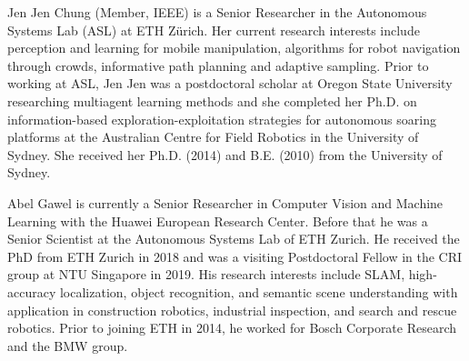 \documentclass[journal]{IEEEtran}  %
\begin{document}
\begin{IEEEbiography}{Jen Jen Chung}
(Member, IEEE) is a Senior Researcher in the Autonomous Systems Lab (ASL) at ETH Zürich. Her current research interests include perception and learning for mobile manipulation, algorithms for robot navigation through crowds, informative path planning and adaptive sampling. Prior to working at ASL, Jen Jen was a postdoctoral scholar at Oregon State University researching multiagent learning methods and she completed her Ph.D. on information-based exploration-exploitation strategies for autonomous soaring platforms at the Australian Centre for Field Robotics in the University of Sydney. She received her Ph.D. (2014) and B.E. (2010) from the University of Sydney.
\end{IEEEbiography}
\vspace{-1cm}
\begin{IEEEbiography}{Abel Gawel} is currently a Senior Researcher in Computer Vision and Machine Learning with the Huawei European Research Center. Before that he was a Senior Scientist at the Autonomous Systems Lab of ETH Zurich. He received the PhD from ETH Zurich in 2018 and was a visiting Postdoctoral Fellow in the CRI group at NTU Singapore in 2019. His research interests include SLAM, high-accuracy localization, object recognition, and semantic scene understanding with application in construction robotics, industrial inspection, and search and rescue robotics. Prior to joining ETH in 2014, he worked for Bosch Corporate Research and the BMW group.
\end{IEEEbiography}
\vspace{-1cm}
\end{document}

